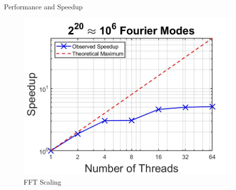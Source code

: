 \documentclass{beamer}
\begin{document}
\begin{frame}{Performance and Speedup}
\begin{minipage}{0.49\textwidth}
\begin{figure}
    \centering
    \includegraphics[width=\textwidth]{Images/FFT_scaling.jpg}
    \caption{FFT Scaling}
    \label{fig:FFT_scaling}
\end{figure}
\end{minipage}
\begin{minipage}{0.49\textwidth}

\end{minipage}
\end{frame}
\end{document}
